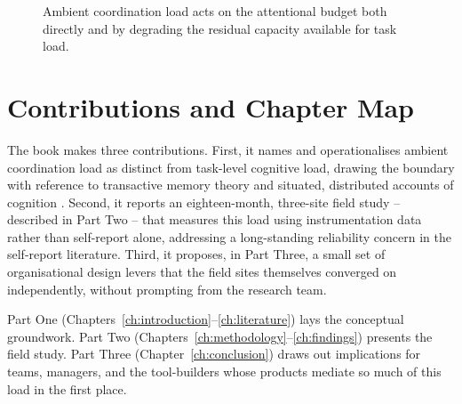 \begin{figure}[htbp]
\centering
{}
\caption{Ambient coordination load acts on the attentional budget both
directly and by degrading the residual capacity available for task load.}
\label{fig:model}
\end{figure}

\section{Contributions and Chapter Map}

The book makes three contributions. First, it names and operationalises
ambient coordination load as distinct from
task-level cognitive load, drawing the boundary with reference to
transactive memory theory \citep{wegner1986transactive} and situated,
distributed accounts of cognition \citep{hutchins1995cognition,
hollan2000distributed}. Second, it reports an eighteen-month, three-site
field study -- described in Part Two -- that measures this load using
instrumentation data rather than self-report alone, addressing a
long-standing reliability concern in the self-report literature. Third, it
proposes, in Part Three, a small set of organisational design levers that
the field sites themselves converged on independently, without prompting
from the research team.

Part One (Chapters~\ref{ch:introduction}--\ref{ch:literature}) lays the
conceptual groundwork. Part Two
(Chapters~\ref{ch:methodology}--\ref{ch:findings}) presents the field study.
Part Three (Chapter~\ref{ch:conclusion}) draws out implications for teams,
managers, and the tool-builders whose products mediate so much of this
load in the first place.
